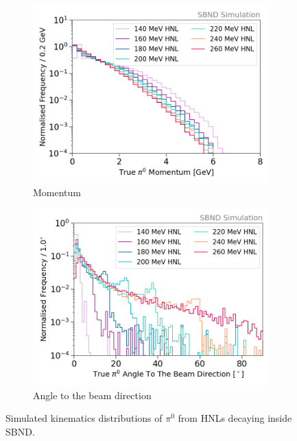 \begin{figure}[ht!]
        \centering
        \begin{subfigure}[b]{0.495\textwidth}
            \centering
            \includegraphics[width=\textwidth]{pi0_energy}
            \caption{Momentum}%
        \end{subfigure}
        \hfill
        \begin{subfigure}[b]{0.495\textwidth}  
            \centering 
            \includegraphics[width=\textwidth]{pi0_angle2Beam}
            \caption{Angle to the beam direction}%
        \end{subfigure}
        \caption[Simulated Kinematics Distributions of Neutral Pions from HNLs]{Simulated kinematics distributions of $\pi^0$ from HNLs decaying inside SBND.}
        \label{fig:pi0_distribution}
\end{figure}

